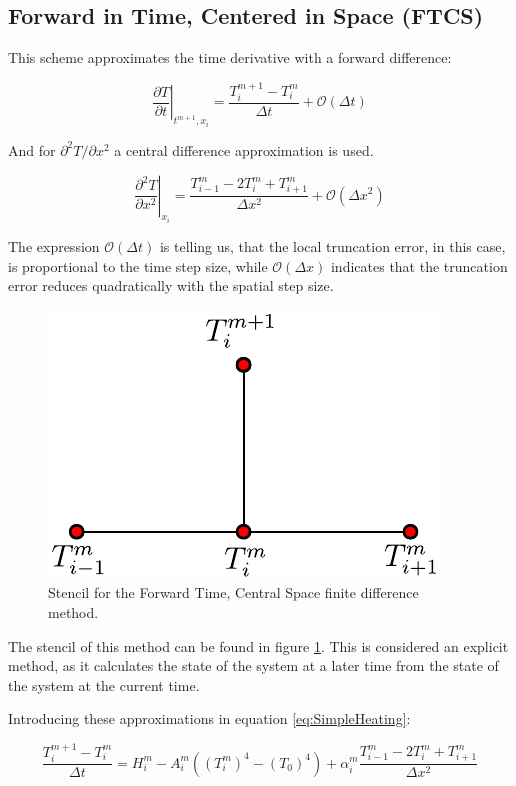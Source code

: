 \subsection{Forward in Time, Centered in Space (FTCS)}

This scheme approximates the time derivative with a forward difference: 

\begin{equation}
    \left. \frac{\partial T}{\partial t}\right|_{t^{m+1},x_i}  = \frac{T^{m+1}_i - T^m_i}{\Delta t} +  \mathcal{O} \left( \Delta t \right)
 \end{equation}

And for $\partial^2 T/ \partial x^2$ a central difference approximation is used. 

\begin{equation}
    \left. \frac{\partial^2 T}{\partial x^2}\right|_{x_i} = \frac{T^{m}_{i-1}-2T^m_{i}+T^m_{i+1}}{\Delta x^2}+\mathcal{O}\left(\Delta x^2 \right)
    \label{eq:CD}
\end{equation}

The expression $\mathcal{O}(\Delta t)$ is telling us, that the local truncation error, in this case, is proportional to the time step size, while $\mathcal{O}(\Delta x)$ indicates that the truncation error reduces quadratically with the spatial step size. 

\begin{figure}[h]
    \centering
    \includegraphics[width=0.35\columnwidth]{Stencils_FiniteDifferences/FTCS.pdf}
    \caption{Stencil for the Forward Time, Central Space finite difference method.}
    \label{fig:StencilFTCS}
\end{figure}

The stencil of this method can be found in figure \ref{fig:StencilFTCS}. This is considered an explicit method, as it calculates the state of the system at a later time from the state of the system at the current time. 

Introducing these approximations in equation \ref{eq:SimpleHeating}:

\begin{equation}
    \frac{T^{m+1}_i - T^m_i}{\Delta t} = H^m_i - A_i^m \left((T_i^m )^4 - (T_0)^4\right) +\alpha_i^m    \frac{T^{m}_{i-1}-2T^m_{i}+T^m_{i+1}}{\Delta x^2}
\end{equation}

